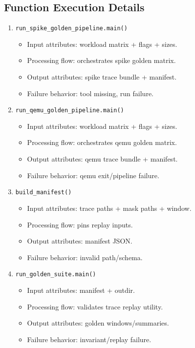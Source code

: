 \documentclass[11pt,a4paper]{article}
\begin{document}
\subsection*{Function Execution Details}
\begin{enumerate}[leftmargin=*]
  \item \texttt{run\_spike\_golden\_pipeline.main()}
  \begin{itemize}[leftmargin=*]
    \item Input attributes: workload matrix + flags + sizes.
    \item Processing flow: orchestrates spike golden matrix.
    \item Output attributes: spike trace bundle + manifest.
    \item Failure behavior: tool missing, run failure.
  \end{itemize}
  \item \texttt{run\_qemu\_golden\_pipeline.main()}
  \begin{itemize}[leftmargin=*]
    \item Input attributes: workload matrix + flags + sizes.
    \item Processing flow: orchestrates qemu golden matrix.
    \item Output attributes: qemu trace bundle + manifest.
    \item Failure behavior: qemu exit/pipeline failure.
  \end{itemize}
  \item \texttt{build\_manifest()}
  \begin{itemize}[leftmargin=*]
    \item Input attributes: trace paths + mask paths + window.
    \item Processing flow: pins replay inputs.
    \item Output attributes: manifest JSON.
    \item Failure behavior: invalid path/schema.
  \end{itemize}
  \item \texttt{run\_golden\_suite.main()}
  \begin{itemize}[leftmargin=*]
    \item Input attributes: manifest + outdir.
    \item Processing flow: validates trace replay utility.
    \item Output attributes: golden windows/summaries.
    \item Failure behavior: invariant/replay failure.
  \end{itemize}
\end{enumerate}
\end{document}
